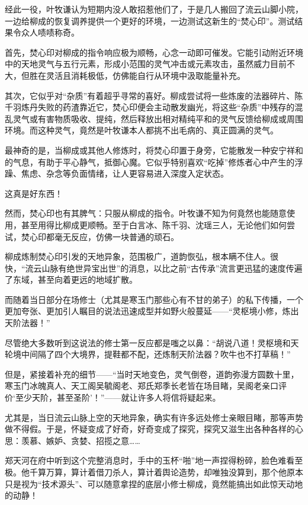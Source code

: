 经此一役，叶牧谦认为短期内没人敢招惹他们了，于是几人搬回了流云山脚小院，一边给柳成的恢复调养提供一个更好的环境，一边测试这新生的“焚心印”。测试结果令众人啧啧称奇。

首先，焚心印对柳成的指令响应极为顺畅，心念一动即可催发。它能引动附近环境中的天地灵气与五行元素，形成小范围的灵气冲击或元素攻击，虽然威力目前不大，但胜在灵活且消耗极低，仿佛能自行从环境中汲取能量补充。

其次，它似乎对“杂质”有着超乎寻常的喜好。柳成尝试将一些炼废的法器碎片、陈千羽炼丹失败的药渣靠近它，焚心印便会主动散发幽光，将这些“杂质”中残存的混乱灵气或有害物质吸收、提纯，然后释放出相对精纯平和的灵气反馈给柳成或周围环境。而这种灵气，竟然是叶牧谦本人都挑不出毛病的、真正圆满的灵气。

最神奇的是，当柳成或其他人修炼时，将焚心印置于身旁，它能散发一种安宁祥和的气息，有助于平心静气，抵御心魔。它似乎特别喜欢“吃掉”修炼者心中产生的浮躁、焦虑、杂念等负面情绪，让人更容易进入深度入定状态。

这真是好东西！

然而，焚心印也有其脾气：只服从柳成的指令。叶牧谦不知为何竟然也能随意使用，甚至用得比柳成更顺畅。至于白言冰、陈千羽、沈瑶三人，无论他们如何尝试，焚心印都毫无反应，仿佛一块普通的顽石。

\vspace{2em}

柳成炼制焚心印引发的天地异象，范围极广，道韵恢弘，根本瞒不住人。很快，“流云山脉有绝世异宝出世”的消息，以比之前“古传承”流言更迅猛的速度传遍了东域，甚至向着更远的地域扩散。

而随着当日部分在场修士（尤其是寒玉门那些心有不甘的弟子）的私下传播，一个更加夸张、更加引人瞩目的说法迅速成型并如野火般蔓延——“灵枢境小修，炼出天阶法器！”

尽管绝大多数听到这说法的修士第一反应都是嗤之以鼻：“胡说八道！灵枢境和天轮境中间隔了四个大境界，提鞋都不配，还炼制天阶法器？吹牛也不打草稿！”

但是，紧接着补充的细节——“当时天地变色，灵气倒卷，道韵弥漫方圆数十里，寒玉门冰魄真人、天工阁吴毓阁老、郑氏郑季长老皆在场目睹，吴阁老亲口评价‘至少天阶，甚至圣阶’！”——就让许多人将信将疑起来。

尤其是，当日流云山脉上空的天地异象，确实有许多远处修士亲眼目睹，那等声势做不得假。于是，怀疑变成了好奇，好奇变成了探究，探究又滋生出各种各样的心思：羡慕、嫉妒、贪婪、招揽之意……

郑天河在府中听到这个完整消息时，手中的玉杯“啪”地一声捏得粉碎，脸色难看至极。他千算万算，算计着借刀杀人，算计着舆论造势，却唯独没算到，那个他原本只是视为“技术源头”、可以随意拿捏的底层小修士柳成，竟然能搞出如此惊天动地的动静！

